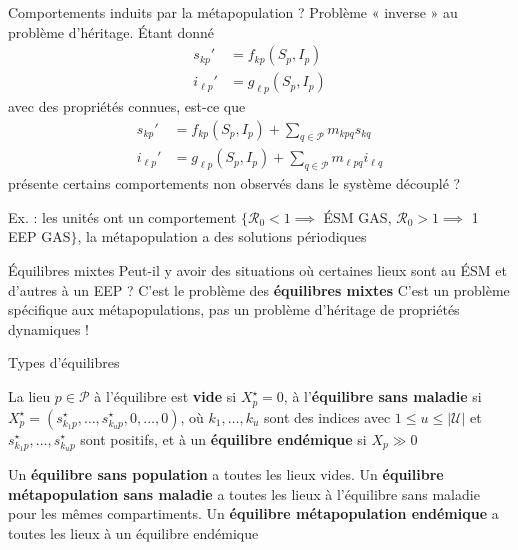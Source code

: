 \documentclass[aspectratio=169]{beamer}\usepackage[]{graphicx}\usepackage[]{xcolor}
\begin{document}
\begin{frame}{Comportements induits par la métapopulation ?}
	Problème « inverse » au problème d'héritage. Étant donné
	\begin{align}
	s_{kp}' &= f_{kp}(S_p,I_p)  \tag{9a} \\
	i_{\ell p}' &= g_{\ell p}(S_p,I_p) \tag{9b}
	\end{align}
	avec des propriétés connues, est-ce que
	\begin{align}
	s_{kp}' &= f_{kp}(S_p,I_p)+\textstyle{\sum_{q\in\mathcal{P}}} m_{kpq}s_{kq}  \tag{10a} \\
	i_{\ell p}' &= g_{\ell p}(S_p,I_p)+\textstyle{\sum_{q\in\mathcal{P}}} m_{\ell pq}i_{\ell q}  \tag{10b}
	\end{align}
	présente certains comportements non observés dans le système découplé ?
	
	Ex. : les unités ont un comportement $\{\mathcal{R}_0<1\implies$ ÉSM GAS, $\mathcal{R}_0>1\implies$ 1 EEP GAS$\}$, la métapopulation a des solutions périodiques
		
\end{frame}

\begin{frame}{Équilibres mixtes}
	Peut-il y avoir des situations où certaines lieux sont au ÉSM et d'autres à un EEP ?
	\vfill
	C'est le problème des \textbf{équilibres mixtes}
	\vfill
	C'est un problème spécifique aux métapopulations, pas un problème d'héritage de propriétés dynamiques !
\end{frame}

\begin{frame}{Types d'équilibres}
	\begin{definition}
		La lieu $p\in\mathcal{P}$ à l'équilibre est \textbf{vide} si $X_p^\star=0$, à l'\textbf{équilibre sans maladie} si $X_p^\star=(s_{k_1p}^\star,\ldots,s_{k_up}^\star,0,\ldots,0)$, où $k_1,\ldots,k_u$ sont des indices avec $1\leq u\leq|\mathcal{U}|$ et $s_{k_1p}^\star,\ldots,s_{k_up}^\star$ sont positifs, et à un \textbf{équilibre endémique} si $X_p\gg 0$
	\end{definition}
	\vfill
	\begin{definition}
		Un \textbf{équilibre sans population} a toutes les lieux vides. Un \textbf{équilibre métapopulation sans maladie} a toutes les lieux à l'équilibre sans maladie pour les mêmes compartiments. Un \textbf{équilibre métapopulation endémique} a toutes les lieux à un équilibre endémique
	\end{definition}
\end{frame}
\end{document}
